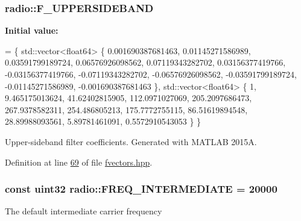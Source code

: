 \hypertarget{namespaceradio_a0ec4548711b6d6ed6867c70b3fc2a413}{
\subsubsection[{F\+\_\+\+U\+P\+P\+E\+R\+S\+I\+D\+E\+B\+A\+N\+D}]{ radio\+::\+F\+\_\+\+U\+P\+P\+E\+R\+S\+I\+D\+E\+B\+A\+N\+D}}\label{namespaceradio_a0ec4548711b6d6ed6867c70b3fc2a413}
{\bfseries Initial value\+:}
\begin{DoxyCode}
= \{ std::vector<float64> \{
        0.001690387681463, 
            0.01145271586989, 
            0.03591799189724, 
            0.06576926098562,
            0.07119343282702,
            0.03156377419766,
            -0.03156377419766,
            -0.07119343282702,
            -0.06576926098562,
            -0.03591799189724,
            -0.01145271586989,
            -0.001690387681463
    \}, std::vector<float64> \{
        1,  
            9.465175013624,
            41.62402815905,
            112.0971027069,
            205.2097686473,    
            267.9378582311,     
            254.486805213,
            175.7772755115,
            86.51619894548,   
            28.89988093561,     
            5.89781461091,
            0.5572910543053   
    \} \}
\end{DoxyCode}
Upper-\/sideband filter coefficients. Generated with M\+A\+T\+L\+A\+B 2015\+A. 

Definition at line \hyperlink{fvectors_8hpp_source_l00069}{69} of file \hyperlink{fvectors_8hpp_source}{fvectors.\+hpp}.

\hypertarget{namespaceradio_aa82ddc6ba206798fd70ffc25665b3cb6}{
\subsubsection[{F\+R\+E\+Q\+\_\+\+I\+N\+T\+E\+R\+M\+E\+D\+I\+A\+T\+E}]{\setlength{\rightskip}{0pt plus 5cm}const {\bf uint32} radio\+::\+F\+R\+E\+Q\+\_\+\+I\+N\+T\+E\+R\+M\+E\+D\+I\+A\+T\+E = 20000}}\label{namespaceradio_aa82ddc6ba206798fd70ffc25665b3cb6}
The default intermediate carrier frequency 

